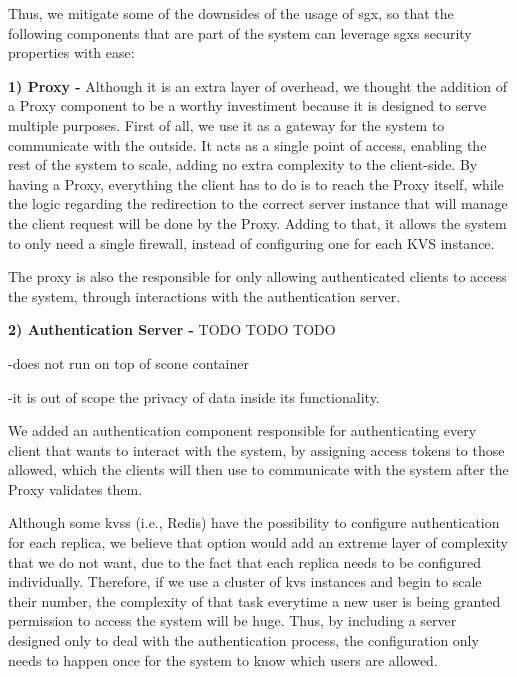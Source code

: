 Thus, we mitigate some of the downsides of the usage of \gls{sgx}, so that the following components that are part of the system can leverage \gls{sgx}s security properties with ease:

\vspace{5mm} 

\textbf{1) Proxy -}
Although it is an extra layer of overhead, we thought the addition of a Proxy component to be a worthy investiment because it is designed to serve multiple purposes. 
First of all, we use it as a gateway for the system to communicate with the outside. It acts as a single point of access, enabling the rest of the system to scale, adding no extra complexity to the client-side. By having a Proxy, everything the client has to do is to reach the Proxy itself, while the logic regarding the redirection to the correct server instance that will manage the client request will be done by the Proxy. Adding to that, it allows the system to only need a single firewall, instead of configuring one for each KVS instance.

The proxy is also the responsible for only allowing authenticated clients to access the system, through interactions with the authentication server. 

\vspace{5mm} 

\textbf{2) Authentication Server -} TODO TODO TODO

-does not run on top of scone container

-it is out of scope the privacy of data inside its functionality.

We added an authentication component responsible for authenticating every client that wants to interact with the system, by assigning access tokens to those allowed, which the clients will then use to communicate with the system after the Proxy validates them.
 
Although some \gls{kvs}s (i.e., Redis) have the possibility to configure authentication for each replica, we believe that option would add an extreme layer of complexity that we do not want, due to the fact that each replica needs to be configured individually. Therefore, if we use a cluster of \gls{kvs} instances and begin to scale their number, the complexity of that task everytime a new user is being granted permission to access the system will be huge. Thus, by including a server designed only to deal with the authentication process, the configuration only needs to happen once for the system to know which users are allowed.

